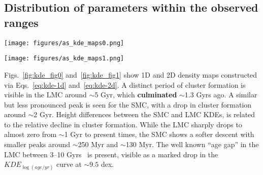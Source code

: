 \documentclass[referee]{aa}
\begin{document}

\subsection{Distribution of parameters within the observed ranges}
\label{ssec:dist_ranges}

\begin{figure*}
\texttt{[image: figures/as\_kde\_maps0.png]}
\caption{Adaptive Gaussian KDEs for age, metallicity, and mass. Top and right
plots are 1D KDEs, center plots are 2D KDEs. Observed clusters are plotted as
red and blue stars for the S/LMC, respectively. Sizes are scaled according to
each cluster's radius. A small scatter is introduced for clarity.}
\label{fig:kde_fig0}
\end{figure*}

\begin{figure*}
\texttt{[image: figures/as\_kde\_maps1.png]}
\caption{Same as Fig.~\ref{fig:kde_fig0} for $E_{(B-V)}$ and distance
modulus.}
\label{fig:kde_fig1}
\end{figure*}

Figs.~\ref{fig:kde_fig0} and~\ref{fig:kde_fig1} show 1D and 2D density maps
constructed via Eqs.~\ref{eq:kde-1d} and~\ref{eq:kde-2d}.
%
%
A distinct period of cluster formation is visible in the LMC around ${\sim}$5
Gyr, which \textbf{culminated} ${\sim}$1.3 Gyrs ago. A similar but less
pronounced peak is seen for the SMC, with a drop in cluster formation around
${\sim}$2 Gyr.
Height differences between the SMC and LMC KDEs, is related to the relative
decline in cluster formation. While the LMC sharply drops to almost zero from
${\sim}$1 Gyr to present times, the SMC shows a softer descent with smaller
peaks around ${\sim}$250 Myr and ${\sim}$130 Myr.
The well known ``age gap'' in the LMC between 3--10 Gyrs~\citep{Balbinot_2010}
is present, visible as a marked drop in the $KDE_{\log(age/yr)}$ curve at
$\sim9.5$ dex.
\end{document}
